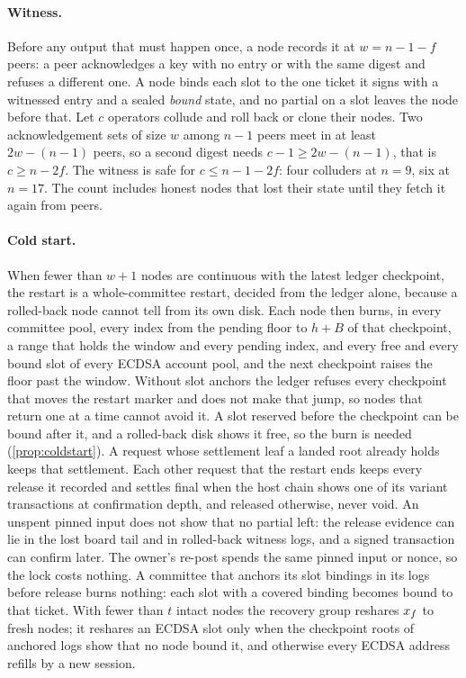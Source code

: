 \paragraph{Witness.} Before any output that must happen once, a node records it at $w = n - 1 - f$ peers: a peer acknowledges a key with no entry or with the same digest and refuses a different one. A node binds each slot to the one ticket it signs with a witnessed entry and a sealed \emph{bound} state, and no partial on a slot leaves the node before that. Let $c$ operators collude and roll back or clone their nodes. Two acknowledgement sets of size $w$ among $n - 1$ peers meet in at least $2w - (n-1)$ peers, so a second digest needs $c - 1 \ge 2w - (n-1)$, that is $c \ge n - 2f$. The witness is safe for $c \le n - 1 - 2f$: four colluders at $n = 9$, six at $n = 17$. The count includes honest nodes that lost their state until they fetch it again from peers.

\paragraph{Cold start.} When fewer than $w + 1$ nodes are continuous with the latest ledger checkpoint, the restart is a whole-committee restart, decided from the ledger alone, because a rolled-back node cannot tell from its own disk. Each node then burns, in every committee pool, every index from the pending floor to $h + B$ of that checkpoint, a range that holds the window and every pending index, and every free and every bound slot of every ECDSA account pool, and the next checkpoint raises the floor past the window. Without slot anchors the ledger refuses every checkpoint that moves the restart marker and does not make that jump, so nodes that return one at a time cannot avoid it. A slot reserved before the checkpoint can be bound after it, and a rolled-back disk shows it free, so the burn is needed (\cref{prop:coldstart}). A request whose settlement leaf a landed root already holds keeps that settlement. Each other request that the restart ends keeps every release it recorded and settles final when the host chain shows one of its variant transactions at confirmation depth, and released otherwise, never void. An unspent pinned input does not show that no partial left: the release evidence can lie in the lost board tail and in rolled-back witness logs, and a signed transaction can confirm later. The owner's re-post spends the same pinned input or nonce, so the lock costs nothing. A committee that anchors its slot bindings in its logs before release burns nothing: each slot with a covered binding becomes bound to that ticket. With fewer than $t$ intact nodes the recovery group reshares $x_{f}$ to fresh nodes; it reshares an ECDSA slot only when the checkpoint roots of anchored logs show that no node bound it, and otherwise every ECDSA address refills by a new session.


